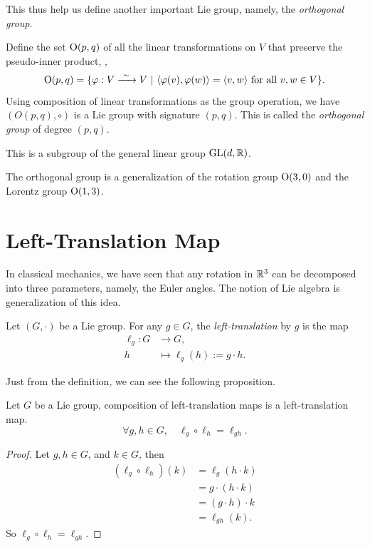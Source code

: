 This thus help us define another important Lie group, namely, the \emph{orthogonal group}.
\begin{example}
    Define the set \(\mathrm{O}(p, q)\) of all the linear transformations on \(V\) that preserve the pseudo-inner product, \ie,
    \begin{equation*}
        \mathrm{O}(p, q) = \{\varphi: V \xrightarrow{\ \sim\ } V \ |\  \langle \varphi(v), \varphi(w) \rangle = \langle v, w \rangle \text{ for all } v, w \in V\}.
    \end{equation*}
    Using composition of linear transformations as the group operation, we have \((O(p, q), \circ)\) is a Lie group with signature \((p, q)\). This is called the \emph{orthogonal group} of degree \((p, q)\).

    This is a subgroup of the general linear group \(\operatorname{GL}(d, \mathbb R)\).
\end{example}
The orthogonal group is a generalization of the rotation group \(\mathrm{O}(3, 0)\) and the Lorentz group \(\mathrm{O}(1, 3)\).

\section{Left-Translation Map}

In classical mechanics, we have seen that any rotation in \(\mathbb R^3\) can be decomposed into three parameters, namely, the Euler angles. The notion of Lie algebra is generalization of this idea.
\begin{definition}
    Let \((G, \cdot)\) be a Lie group. For any \(g \in G\), the \emph{left-translation} by \(g\) is the map
    \begin{align*}
        \ell_g: G & \to G,                          \\
        h         & \mapsto \ell_g(h) := g \cdot h.
    \end{align*}
\end{definition}
Just from the definition, we can see the following proposition.
\begin{proposition}
    Let \(G\) be a Lie group, composition of left-translation maps is a left-translation map.
    \begin{equation*}
        \forall g, h \in G, \quad \ell_g \circ \ell_h = \ell_{g h}.
    \end{equation*}
\end{proposition}
\begin{proof}
    Let \(g, h \in G\), and \(k \in G\), then
    \begin{align*}
        (\ell_g \circ \ell_h)(k) & = \ell_g(h \cdot k)   \\
                                 & = g \cdot (h \cdot k) \\
                                 & = (g \cdot h) \cdot k \\
                                 & = \ell_{g h}(k).
    \end{align*}
    So \(\ell_g \circ \ell_h = \ell_{g h}\).
\end{proof}

